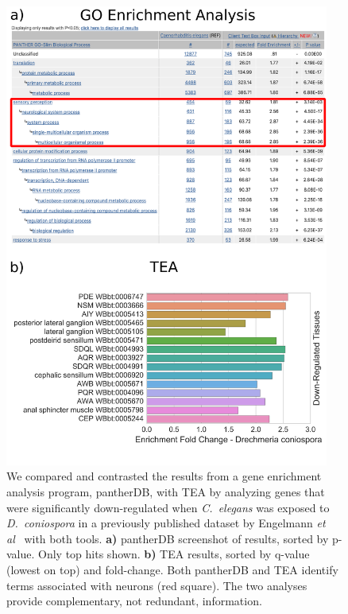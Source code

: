 \documentclass{bmcart}
\begin{document}
\begin{backmatter}
\begin{figure}[h!]
    \includegraphics[width=0.95\textwidth]{figures/engelmann-GO-tea-comparison.png}
	\captionsetup{width= 0.95\textwidth}
  	\caption{
	We compared and contrasted the results from a gene enrichment analysis program, pantherDB, with TEA by analyzing genes that were significantly down-regulated when \emph{C.~elegans} was exposed to \emph{D.~coniospora} in a previously published dataset by Engelmann \emph{et al}~\cite{Engelmann2011} with both tools. 
	\textbf{a)} pantherDB screenshot of results, sorted by p-value. Only top hits shown.
	\textbf{b)} TEA results, sorted by q-value (lowest on top) and fold-change. 
	Both pantherDB and TEA identify terms associated with neurons (red square). The two analyses provide complementary, not redundant, information.
	}
	\label{fig:Dcon}
\end{figure}



\end{backmatter}
\end{document}
